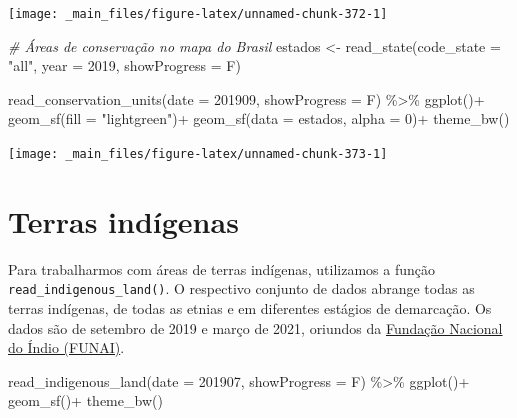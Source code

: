 \documentclass[
  brazilian,
]{book}
\newenvironment{Shaded}{\begin{snugshade}}{\end{snugshade}}
\newcommand{\AttributeTok}[1]{\textcolor[rgb]{0.77,0.63,0.00}{#1}}
\newcommand{\CommentTok}[1]{\textcolor[rgb]{0.56,0.35,0.01}{\textit{#1}}}
\newcommand{\DecValTok}[1]{\textcolor[rgb]{0.00,0.00,0.81}{#1}}
\newcommand{\FunctionTok}[1]{\textcolor[rgb]{0.00,0.00,0.00}{#1}}
\newcommand{\NormalTok}[1]{#1}
\newcommand{\OtherTok}[1]{\textcolor[rgb]{0.56,0.35,0.01}{#1}}
\newcommand{\SpecialCharTok}[1]{\textcolor[rgb]{0.00,0.00,0.00}{#1}}
\newcommand{\StringTok}[1]{\textcolor[rgb]{0.31,0.60,0.02}{#1}}
\begin{document}
\begin{center}\texttt{[image: \_main\_files/figure-latex/unnamed-chunk-372-1]} \end{center}

\begin{Shaded}
\begin{Highlighting}[]
\CommentTok{\# Áreas de conservação no mapa do Brasil}
\NormalTok{estados }\OtherTok{\textless{}{-}} \FunctionTok{read\_state}\NormalTok{(}\AttributeTok{code\_state =} \StringTok{"all"}\NormalTok{,}
                      \AttributeTok{year =} \DecValTok{2019}\NormalTok{,}
                      \AttributeTok{showProgress =}\NormalTok{ F)}

\FunctionTok{read\_conservation\_units}\NormalTok{(}\AttributeTok{date =} \DecValTok{201909}\NormalTok{,}
                        \AttributeTok{showProgress =}\NormalTok{ F) }\SpecialCharTok{\%\textgreater{}\%} 
  \FunctionTok{ggplot}\NormalTok{()}\SpecialCharTok{+}
  \FunctionTok{geom\_sf}\NormalTok{(}\AttributeTok{fill =} \StringTok{"lightgreen"}\NormalTok{)}\SpecialCharTok{+}
  \FunctionTok{geom\_sf}\NormalTok{(}\AttributeTok{data =}\NormalTok{ estados, }\AttributeTok{alpha =} \DecValTok{0}\NormalTok{)}\SpecialCharTok{+}
  \FunctionTok{theme\_bw}\NormalTok{()}
\end{Highlighting}
\end{Shaded}

\begin{center}\texttt{[image: \_main\_files/figure-latex/unnamed-chunk-373-1]} \end{center}

\hypertarget{terras-induxedgenas}{%
\section{Terras indígenas}\label{terras-induxedgenas}}

Para trabalharmos com áreas de terras indígenas, utilizamos a função \texttt{read\_indigenous\_land()}. O respectivo conjunto de dados abrange todas as terras indígenas, de todas as etnias e em diferentes estágios de demarcação. Os dados são de setembro de 2019 e março de 2021, oriundos da \href{https://www.gov.br/funai/pt-br}{Fundação Nacional do Índio (FUNAI)}.

\begin{Shaded}
\begin{Highlighting}[]
\FunctionTok{read\_indigenous\_land}\NormalTok{(}\AttributeTok{date =} \DecValTok{201907}\NormalTok{,}
                     \AttributeTok{showProgress =}\NormalTok{ F) }\SpecialCharTok{\%\textgreater{}\%} 
  \FunctionTok{ggplot}\NormalTok{()}\SpecialCharTok{+}
  \FunctionTok{geom\_sf}\NormalTok{()}\SpecialCharTok{+}
  \FunctionTok{theme\_bw}\NormalTok{()}
\end{Highlighting}
\end{Shaded}
\end{document}
